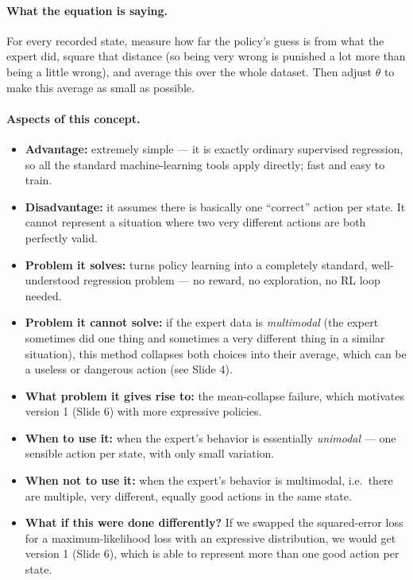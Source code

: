 \documentclass[11pt]{article}
\begin{document}
\paragraph{What the equation is saying.}
For every recorded state, measure how far the policy's guess is from what the expert
did, square that distance (so being very wrong is punished a lot more than being a
little wrong), and average this over the whole dataset. Then adjust $\theta$ to make
this average as small as possible.

\paragraph{Aspects of this concept.}
\begin{itemize}
\item \textbf{Advantage:} extremely simple --- it is exactly ordinary supervised
regression, so all the standard machine-learning tools apply directly; fast and easy to
train.
\item \textbf{Disadvantage:} it assumes there is basically one ``correct'' action per
state. It cannot represent a situation where two very different actions are both
perfectly valid.
\item \textbf{Problem it solves:} turns policy learning into a completely standard,
well-understood regression problem --- no reward, no exploration, no RL loop needed.
\item \textbf{Problem it cannot solve:} if the expert data is \emph{multimodal} (the
expert sometimes did one thing and sometimes a very different thing in a similar
situation), this method collapses both choices into their average, which can be a
useless or dangerous action (see Slide 4).
\item \textbf{What problem it gives rise to:} the mean-collapse failure, which motivates
version 1 (Slide 6) with more expressive policies.
\item \textbf{When to use it:} when the expert's behavior is essentially
\emph{unimodal} --- one sensible action per state, with only small variation.
\item \textbf{When not to use it:} when the expert's behavior is multimodal, i.e.\ there
are multiple, very different, equally good actions in the same state.
\item \textbf{What if this were done differently?} If we swapped the squared-error loss
for a maximum-likelihood loss with an expressive distribution, we would get version 1
(Slide 6), which is able to represent more than one good action per state.
\end{itemize}
\end{document}
